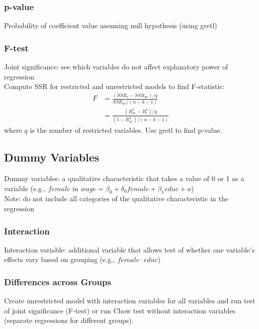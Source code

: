 \documentclass[12pt]{article}
\numberwithin{equation}{section}
\begin{document}
\subsubsection{p-value}
Probability of coefficient value assuming null hypothesis (using gretl)

\subsubsection{F-test}
Joint significance: see which variables do not affect explanatory power of regression \\[0.5cm]
Compute SSR for restricted and unrestricted models to find F-statistic:
\begin{align}
    F &= \frac{(SSR_r - SSR_{ur})/q}{SSR_{ur}/(n-k-1)} \\
    &= \frac{(R_{ur}^2 - R_{r}^2)/q}{(1-R_{ur}^2)/(n-k-1)}
\end{align}
where $q$ is the number of restricted variables. Use gretl to find p-value.


\subsection{Dummy Variables}
Dummy variables: a qualitative characteristic that takes a value of 0 or 1 as a variable (e.g., $female$ in $wage = \beta_0 + \delta_0  female + \beta_1 educ + u$) \\[0.5cm]
Note: do not include all categories of the qualitative characteristic in the regression

\subsubsection{Interaction}
Interaction variable: additional variable that allows test of whether one variable's effects vary based on grouping (e.g., $female \cdot educ$)

\subsubsection{Differences across Groups}
Create unrestricted model with interaction variables for all variables and run test of joint significance (F-test) or run Chow test without interaction variables (separate regressions for different groups).
\end{document}
